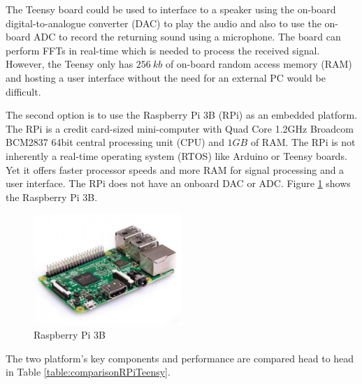 The Teensy board could be used to interface to a speaker using the on-board digital-to-analogue converter (DAC) to play the audio and also to use the on-board ADC to record the returning sound using a microphone. The board can perform FFTs in real-time which is needed to process the received signal. However, the Teensy only has $256\ kb$ of on-board random access memory (RAM) and hosting a user interface without the need for an external PC would be difficult.

The second option is to use the Raspberry Pi 3B (RPi) as an embedded platform. The RPi is a credit card-sized mini-computer with Quad Core 1.2GHz Broadcom BCM2837 64bit central processing unit (CPU) and $1GB$ of RAM. The RPi is not inherently a real-time operating system (RTOS) like Arduino or Teensy boards. Yet it offers faster processor speeds and more RAM for signal processing and a user interface. The RPi does not have an onboard DAC or ADC. Figure \ref{fig:rpi3b} shows the Raspberry Pi 3B.

\begin{figure}[h!]
    \centering
    \includegraphics[width = 0.5\textwidth]{images/rpi3b.pdf}
    \caption{Raspberry Pi 3B}\label{fig:rpi3b}
\end{figure}

The two platform's key components and performance are compared head to head in Table \ref{table:comparisonRPiTeensy}.


